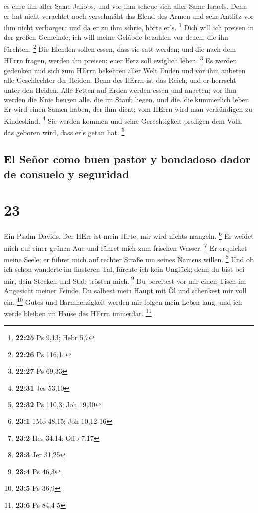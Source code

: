 es ehre ihn aller Same Jakobs, und vor ihm scheue sich aller Same
Israels.  Denn er hat nicht verachtet noch verschmäht das
Elend des Armen und sein Antlitz vor ihm nicht verborgen; und da er zu
ihm schrie, hörte er's. \footnote{\textbf{22:25} Ps 9,13; Hebr 5,7}
 Dich will ich preisen in der großen Gemeinde; ich will
meine Gelübde bezahlen vor denen, die ihn fürchten. \footnote{\textbf{22:26}
  Ps 116,14}  Die Elenden sollen essen, dass sie satt
werden; und die nach dem HErrn fragen, werden ihn preisen; euer Herz
soll ewiglich leben. \footnote{\textbf{22:27} Ps 69,33} 
Es werden gedenken und sich zum HErrn bekehren aller Welt Enden und vor
ihm anbeten alle Geschlechter der Heiden.  Denn des HErrn
ist das Reich, und er herrscht unter den Heiden.  Alle
Fetten auf Erden werden essen und anbeten; vor ihm werden die Knie
beugen alle, die im Staub liegen, und die, die kümmerlich leben.
 Er wird einen Samen haben, der ihm dient; vom HErrn wird
man verkündigen zu Kindeskind. \footnote{\textbf{22:31} Jes 53,10}
 Sie werden kommen und seine Gerechtigkeit predigen dem
Volk, das geboren wird, dass er's getan hat. \footnote{\textbf{22:32} Ps
  110,3; Joh 19,30}

\hypertarget{el-seuxf1or-como-buen-pastor-y-bondadoso-dador-de-consuelo-y-seguridad}{%
\subsection{El Señor como buen pastor y bondadoso dador de consuelo y
seguridad}\label{el-seuxf1or-como-buen-pastor-y-bondadoso-dador-de-consuelo-y-seguridad}}

\hypertarget{section-22}{%
\section{23}\label{section-22}}

 Ein Psalm Davids. Der HErr ist mein Hirte; mir wird
nichts mangeln. \footnote{\textbf{23:1} 1Mo 48,15; Joh 10,12-16}
 Er weidet mich auf einer grünen Aue und führet mich zum
frischen Wasser. \footnote{\textbf{23:2} Hes 34,14; Offb 7,17}
 Er erquicket meine Seele; er führet mich auf rechter
Straße um seines Namens willen. \footnote{\textbf{23:3} Jer 31,25}
 Und ob ich schon wanderte im finsteren Tal, fürchte ich
kein Unglück; denn du bist bei mir, dein Stecken und Stab trösten mich.
\footnote{\textbf{23:4} Ps 46,3}  Du bereitest vor mir
einen Tisch im Angesicht meiner Feinde. Du salbest mein Haupt mit Öl und
schenkest mir voll ein. \footnote{\textbf{23:5} Ps 36,9} 
Gutes und Barmherzigkeit werden mir folgen mein Leben lang, und ich
werde bleiben im Hause des HErrn immerdar. \footnote{\textbf{23:6} Ps
  84,4-5}

